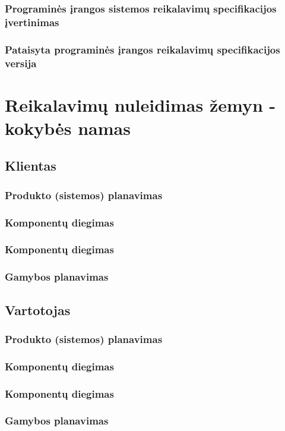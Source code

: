 \documentclass{VUMIFPSkursinis}
\begin{document}
\subsubsection{Programinės įrangos sistemos reikalavimų specifikacijos įvertinimas}
\subsubsection{Pataisyta programinės įrangos reikalavimų specifikacijos versija}

\section{Reikalavimų nuleidimas žemyn - kokybės namas}
\subsection{Klientas}
\subsubsection{Produkto (sistemos) planavimas}
\subsubsection{Komponentų diegimas}
\subsubsection{Komponentų diegimas}
\subsubsection{Gamybos planavimas}
\subsection{Vartotojas}
\subsubsection{Produkto (sistemos) planavimas}
\subsubsection{Komponentų diegimas}
\subsubsection{Komponentų diegimas}
\subsubsection{Gamybos planavimas}
\end{document}
